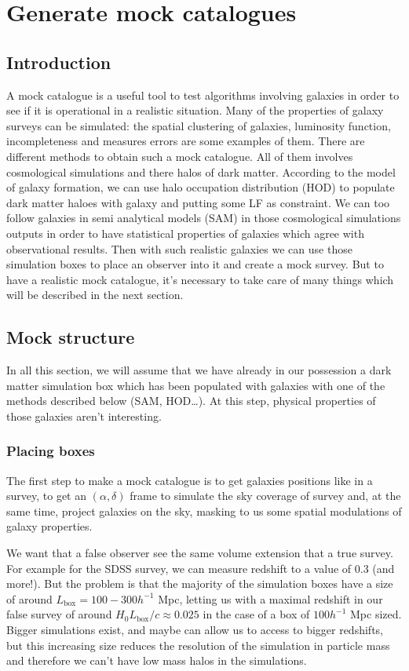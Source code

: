 \chapter{Generate mock catalogues}
%
\section{Introduction}
%
A mock catalogue is a useful tool to test
algorithms involving galaxies in order to see if it is operational in a
realistic situation. Many of the properties of galaxy surveys can be simulated:
the spatial clustering of galaxies, luminosity function, incompleteness and
measures errors are some examples of them. There are different methods to
obtain such a mock catalogue. All of them involves cosmological simulations and
there halos of dark matter. According to the model of galaxy formation, we can
use halo occupation distribution (HOD) to populate dark matter haloes with
galaxy and putting some LF as constraint. We can too follow galaxies in semi
analytical models (SAM) in those cosmological simulations outputs in order to
have statistical properties of galaxies which agree with observational results.
Then with such realistic galaxies we can use those simulation boxes to place an
observer into it and create a mock survey. But to have a realistic mock
catalogue, it's necessary to take care of many things which will be described
in the next section.
%
\section{Mock structure}
%
In all this section, we will assume that we have already in our possession a
dark matter simulation box which has been populated with galaxies with one of
the methods described below (SAM, HOD\ldots). At this step, physical properties
of those galaxies aren't interesting.
%
\subsection{Placing boxes}
%
The first step to make a mock catalogue is to get galaxies positions like in a
survey, to get an $(\alpha,\delta)$ frame to simulate the sky coverage of
survey and, at the same time, project galaxies on the sky, masking to us some
spatial modulations of galaxy properties.

We want that a false observer see the same volume extension that a true survey.
For example for the SDSS survey, we can measure redshift to a value of 0.3 (and
more!). But the problem is that the majority of the simulation boxes have a
size of around $L_{\mathrm{box}}=100-300 h^{-1}$ Mpc, letting us
with a maximal redshift in our false survey of around
${H_0}{L_{\mathrm{box}}}/c\approx 0.025$ in the case of a box of
$100 h^{-1}$ Mpc sized. Bigger simulations exist, and maybe can allow us
to access to bigger redshifts, but this increasing size reduces the resolution
of the simulation in particle mass and therefore we can't have low mass halos
in the simulations.

